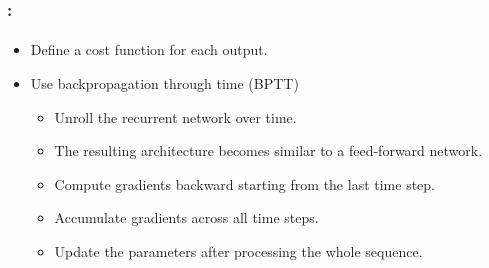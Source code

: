 \documentclass[xcolor=table]{beamer}
\begin{document}
\begin{frame}
	\frametitle{\insertshortsubtitle: \insertsection}
	\framesubtitle{\insertsubsection}
	
	\begin{itemize}
		
		\item Define a cost function for each output.
		
		\item Use backpropagation through time (BPTT) \cite{1990-werbos}
		\begin{itemize}
			
			\item Unroll the recurrent network over time.
			
			\item The resulting architecture becomes similar to a feed-forward network.
			
			\item Compute gradients backward starting from the last time step.
			
			\item Accumulate gradients across all time steps.
			
			\item Update the parameters after processing the whole sequence.
			
		\end{itemize}
		
	\end{itemize}
	
\end{frame}
\end{document}
